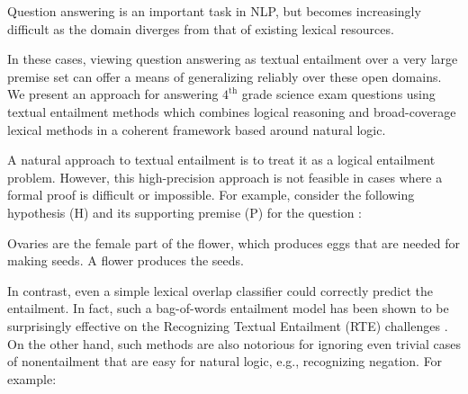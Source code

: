 Question answering is an important task in NLP, but becomes
increasingly difficult as the domain diverges from that of existing lexical resources.

In these cases, viewing question answering as textual entailment over a
  very large premise set can offer a means of generalizing reliably over
  these open domains.
We present an approach for answering $4^\textrm{th}$ grade science exam questions
  using textual entailment methods which combines logical reasoning 
  and broad-coverage lexical methods in a coherent framework based around
  natural logic.

A natural approach to textual entailment
  is to treat it as a logical entailment problem.
However, this high-precision approach is not feasible in cases
    where a formal proof is difficult or impossible.
For example, consider the following hypothesis (H) 
  and its supporting premise (P)
  for the question :

\entailmentExample
{Ovaries are the female part of the flower, which produces eggs that are needed for making seeds.}
{A flower produces the seeds.}

In contrast, even a simple lexical overlap classifier could correctly predict
  the entailment.
In fact, such a bag-of-words entailment model has been shown to be surprisingly
  effective on the Recognizing Textual Entailment (RTE) challenges 
  \cite{key:2009maccartney-thesis}.
On the other hand, such methods are also notorious for ignoring even trivial 
  cases of nonentailment that are easy for natural logic, e.g., recognizing negation.
For example:

